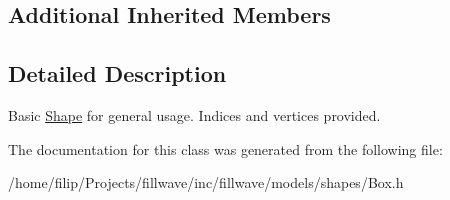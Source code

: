 \subsection*{Additional Inherited Members}


\subsection{Detailed Description}
Basic \hyperlink{classflw_1_1flf_1_1Shape}{Shape} for general usage. Indices and vertices provided. 

The documentation for this class was generated from the following file\+:\begin{DoxyCompactItemize}
\item 
/home/filip/\+Projects/fillwave/inc/fillwave/models/shapes/Box.\+h\end{DoxyCompactItemize}
